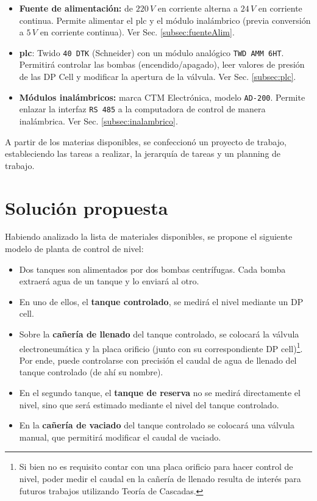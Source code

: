 \begin{itemize}
  \item \textbf{Fuente de alimentación:}
  de $220\,V$ en corriente alterna a $24\,V$ en corriente continua.
  Permite alimentar el \gls{plc} y el módulo inalámbrico (previa conversión a
  $5\,V$ en corriente continua).
  Ver Sec. \ref{subsec:fuenteAlim}.

  \item{\textbf{\gls{plc}}}: Twido \verb|40 DTK| (Schneider) con un módulo
  analógico \verb|TWD AMM 6HT|.
  Permitirá controlar las bombas (encendido/apagado), 
  leer valores de presión de las DP Cell y modificar la apertura de la 
  válvula. Ver Sec. \ref{subsec:plc}.

  \item \textbf{Módulos inalámbricos:} marca CTM Electrónica,
  modelo \verb|AD-200|.
  Permite enlazar la interfaz \verb|RS 485| a la computadora de control
  de manera inalámbrica. Ver Sec. \ref{subsec:inalambrico}.
\end{itemize}

A partir de los materias disponibles, se confeccionó
un proyecto de trabajo, estableciendo las tareas a realizar, la jerarquía de
tareas y un planning de trabajo.

\section{Solución propuesta}
\label{sec:SolucionPropuesta}

Habiendo analizado la lista de materiales disponibles, se propone el siguiente
modelo de planta de control de nivel:
\begin{itemize}
 \item Dos tanques son alimentados por dos bombas centrífugas.
 Cada bomba extraerá agua de un tanque y lo enviará al otro.
 \item En uno de ellos, el \textbf{tanque controlado}, se medirá el nivel
 mediante un DP cell.
 \item Sobre la \textbf{cañería de llenado} del tanque controlado, se
 colocará la válvula electroneumática y la placa orificio (junto
con su correspondiente DP cell)\footnote{Si bien no es  requisito contar con
una placa orificio para hacer  control de nivel,  poder medir el caudal en la
cañería de llenado resulta  de  interés para  futuros trabajos  utilizando
Teoría de Cascadas.}.
 Por ende, puede controlarse con precisión el caudal de agua de llenado del
 tanque controlado (de ahí su nombre).
 \item En el segundo tanque, el \textbf{tanque de reserva} no se medirá
 directamente el  nivel, sino que será estimado mediante el nivel del tanque
 controlado.
 \item En la \textbf{cañería de vaciado} del tanque controlado se colocará una
válvula manual, que permitirá modificar el caudal de vaciado.
\end{itemize}



